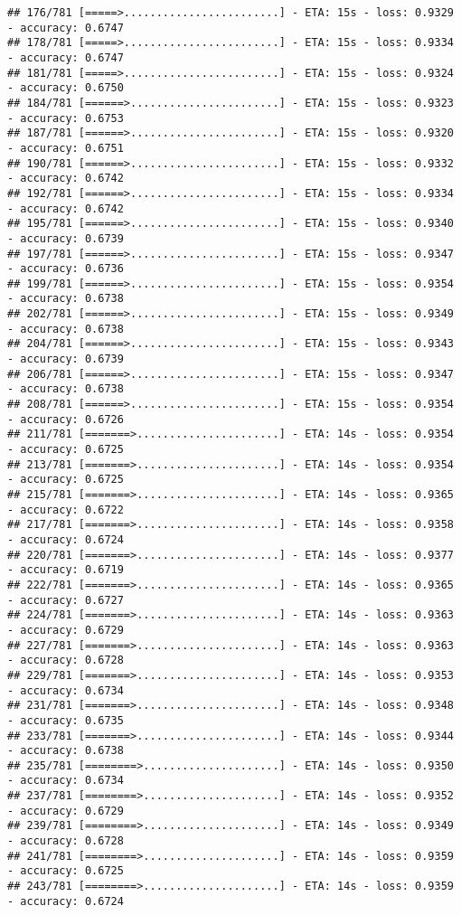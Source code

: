 \documentclass[
]{article}
\begin{document}
\begin{verbatim}
## 176/781 [=====>........................] - ETA: 15s - loss: 0.9329 - accuracy: 0.6747
## 178/781 [=====>........................] - ETA: 15s - loss: 0.9334 - accuracy: 0.6747
## 181/781 [=====>........................] - ETA: 15s - loss: 0.9324 - accuracy: 0.6750
## 184/781 [======>.......................] - ETA: 15s - loss: 0.9323 - accuracy: 0.6753
## 187/781 [======>.......................] - ETA: 15s - loss: 0.9320 - accuracy: 0.6751
## 190/781 [======>.......................] - ETA: 15s - loss: 0.9332 - accuracy: 0.6742
## 192/781 [======>.......................] - ETA: 15s - loss: 0.9334 - accuracy: 0.6742
## 195/781 [======>.......................] - ETA: 15s - loss: 0.9340 - accuracy: 0.6739
## 197/781 [======>.......................] - ETA: 15s - loss: 0.9347 - accuracy: 0.6736
## 199/781 [======>.......................] - ETA: 15s - loss: 0.9354 - accuracy: 0.6738
## 202/781 [======>.......................] - ETA: 15s - loss: 0.9349 - accuracy: 0.6738
## 204/781 [======>.......................] - ETA: 15s - loss: 0.9343 - accuracy: 0.6739
## 206/781 [======>.......................] - ETA: 15s - loss: 0.9347 - accuracy: 0.6738
## 208/781 [======>.......................] - ETA: 15s - loss: 0.9354 - accuracy: 0.6726
## 211/781 [=======>......................] - ETA: 14s - loss: 0.9354 - accuracy: 0.6725
## 213/781 [=======>......................] - ETA: 14s - loss: 0.9354 - accuracy: 0.6725
## 215/781 [=======>......................] - ETA: 14s - loss: 0.9365 - accuracy: 0.6722
## 217/781 [=======>......................] - ETA: 14s - loss: 0.9358 - accuracy: 0.6724
## 220/781 [=======>......................] - ETA: 14s - loss: 0.9377 - accuracy: 0.6719
## 222/781 [=======>......................] - ETA: 14s - loss: 0.9365 - accuracy: 0.6727
## 224/781 [=======>......................] - ETA: 14s - loss: 0.9363 - accuracy: 0.6729
## 227/781 [=======>......................] - ETA: 14s - loss: 0.9363 - accuracy: 0.6728
## 229/781 [=======>......................] - ETA: 14s - loss: 0.9353 - accuracy: 0.6734
## 231/781 [=======>......................] - ETA: 14s - loss: 0.9348 - accuracy: 0.6735
## 233/781 [=======>......................] - ETA: 14s - loss: 0.9344 - accuracy: 0.6738
## 235/781 [========>.....................] - ETA: 14s - loss: 0.9350 - accuracy: 0.6734
## 237/781 [========>.....................] - ETA: 14s - loss: 0.9352 - accuracy: 0.6729
## 239/781 [========>.....................] - ETA: 14s - loss: 0.9349 - accuracy: 0.6728
## 241/781 [========>.....................] - ETA: 14s - loss: 0.9359 - accuracy: 0.6725
## 243/781 [========>.....................] - ETA: 14s - loss: 0.9359 - accuracy: 0.6724

\end{verbatim}
\end{document}
